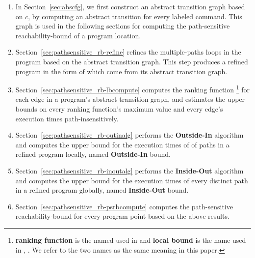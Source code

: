 \begin{enumerate}
\item  In Section~\ref{sec:abscfg}, we first construct an abstract transition graph based on $c$, by computing an abstract transition 
for every labeled command. 
This graph is used in the following sections
for computing the path-sensitive reachability-bound of a program location.
\item Section~\ref{sec:pathsensitive_rb-refine}
refines the multiple-paths loops in the program
based on the abstract transition graph. This step produces a refined program in the form of  which come from its abstract transition graph.
\item Section~\ref{sec:pathsensitive_rb-lbcompute} computes the ranking function  
\footnote{\textbf{ranking function} is the named used in \cite{SinnZV14}
and \textbf{local bound} is the name used in \cite{ZulegerGSV11}, \cite{sinn2017complexity}.
We refer to the two names as the same meaning in this paper.} for each edge in a program's abstract transition graph,
and estimates the upper bounds on every ranking function's maximum value and every edge's execution times path-insensitively.
\item Section~\ref{sec:pathsensitive_rb-outinalg} performs the \textbf{Outside-In} algorithm and computes
the upper bound for the execution times of  of paths in a refined program locally, named \textbf{Outside-In} bound.
\item Section~\ref{sec:pathsensitive_rb-inoutalg} performs the \textbf{Inside-Out} algorithm and 
computes the upper bound for the execution times of
every distinct path in a refined program globally, named \textbf{Inside-Out} bound.
\item Section~\ref{sec:pathsensitive_rb-psrbcompute} computes the path-sensitive reachability-bound for every program point
based on the above results.
\end{enumerate}

